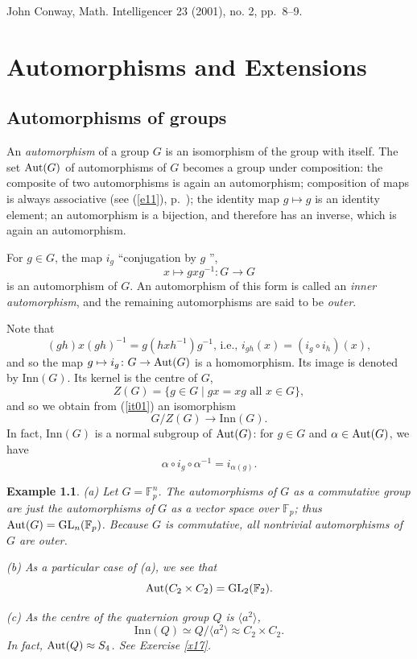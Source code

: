 \documentclass[a4paper,11pt,final]{memoir}%
\newtheorem{example}[X]{Example}
\theoremstyle{nonumberplain}
\begin{document}
{\footnotesize \hfill John Conway, Math. Intelligencer 23 (2001), no. 2,
pp.~8--9.}

\clearpage


\chapter{Automorphisms and Extensions}

\section{Automorphisms of groups}

An \emph{automorphism\/}%
of a group $G$ is an isomorphism of the group with itself. The set $\operatorname{Aut}(G)$
of automorphisms of $G$ becomes a group under composition: the composite of
two automorphisms is again an automorphism; composition of maps is always
associative (see (\ref{e11}), p.~\pageref{e11}); the identity map $g\mapsto g$
is an identity element; an automorphism is a bijection, and therefore has an
inverse, which is again an automorphism.

For $g\in G$, the map $i_{g}$ \textquotedblleft conjugation by $g$%
\textquotedblright,
\[
x\mapsto gxg^{-1}:G\rightarrow G
\]
is an automorphism of $G$. An automorphism of this form is called an
\emph{inner automorphism},%
and the remaining automorphisms are said to be \emph{outer}.%
%


Note that
\[
(gh)x(gh)^{-1}=g(hxh^{-1})g^{-1}\text{, i.e., $i_{gh}(x)=(i_{g}\circ
i_{h})(x)$},
\]
and so the map $g\mapsto i_{g}\colon G\rightarrow\operatorname{Aut}(G)$ is a homomorphism.
Its image is denoted by $\text{Inn}(G)$. Its kernel is the centre of $G$,
\[
Z(G)=\{g\in G\mid gx=xg\text{ all }x\in G\},
\]
and so we obtain from (\ref{it01}) an isomorphism
\[
G/Z(G)\rightarrow\text{Inn}(G).
\]
In fact, $\text{Inn}(G)$ is a normal subgroup of $\operatorname{Aut}(G)$: for $g\in G$ and
$\alpha\in\operatorname{Aut}(G)$, we have
\[
\alpha\circ i_{g}\circ\alpha^{-1}=i_{\alpha(g)}.
\]


\begin{example}
\label{it00a}(a) Let $G=\mathbb{F}_{p}^{n}$. The automorphisms of $G$ as a
commutative group are just the automorphisms of $G$ as a vector space over
$\mathbb{F}_{p}$; thus $\operatorname{Aut}(G)=\operatorname{GL}_{n}(\mathbb{F}_{p})$. Because $G$ is
commutative, all nontrivial automorphisms of $G$ are outer.

(b) As a particular case of (a), we see that
\[
\operatorname{Aut}(C_{2}\times C_{2})=\operatorname{GL}_{2}(\mathbb{F}_{2}).
\]


(c) As the centre of the quaternion group $Q$ is $\langle a^{2}\rangle$,
\[
\text{Inn}(Q)\simeq Q/\langle a^{2}\rangle\approx C_{2}\times C_{2}.
\]
In fact, $\operatorname{Aut}(Q)\approx S_{4}$. See Exercise \ref{x17}.
\end{example}
\end{document}
